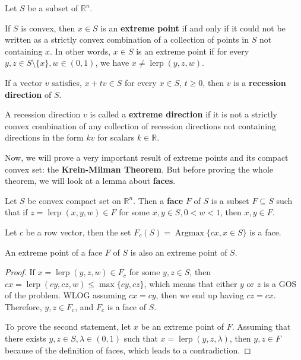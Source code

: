 \begin{definition}
  Let \( S \) be a subset of \( \mathbb{R}^{n} \).

  If \( S \) is convex, then \( x \in S \) is an \textbf{extreme point} if and only if
  it could not be written as a strictly convex combination of a collection
  of points in
  \( S \) not containing \( x \). In other words, \( x \in S \) is an extreme
  point if for every \( y, z \in S \setminus \{x\}, w \in (0, 1)   \), we have
  \( x \neq \operatorname{lerp}(y,z,w) \).

  If a vector \( v \) satisfies, \( x + tv \in S \) for every \( x \in S \), \(
  t \ge  0\), then \( v \) is a \textbf{recession direction} of \( S \).

  A recession direction \( v \) is called a \textbf{extreme direction} if it is
  not a strictly convex combination of any collection of recession directions
  not containing directions in the form \( kv \) for scalars \( k \in \mathbb{R}
  \).
\end{definition}

Now, we will prove a very important result of extreme points and its compact
convex set: the \textbf{Krein-Milman Theorem}. But before proving the whole
theorem, we will look at a lemma about \textbf{faces}.

\begin{lemma}
  Let \( S \) be convex compact set on \( \mathbb{R}^{n} \). Then a \textbf{face}
  \( F \)
  of \( S \) is a subset \( F \subseteq S \) such that if \( z =
  \operatorname{lerp}(x, y, w) \in F \) for some \( x, y \in S, 0 < w < 1 \),
  then \( x, y \in F\).

  Let \( c \) be a row vector, then the set \( F_{c}(S) = \operatorname{Argmax}
  \{cx, x \in S\}     \) is a face.

  An extreme point of a face \( F \) of \( S \) is also an extreme point of \( S
  \).
\end{lemma}

\begin{proof}
  If \( x = \operatorname{lerp}(y,z, w) \in F_{c} \) for some \( y,z \in S \),
  then \( cx = \operatorname{lerp}(cy, cz, w) \le \max \{cy, cz\}   \), which
  means that either \( y \) or \( z \) is a GOS of the problem. WLOG assuming \(
  cx = cy\), then we end up having \( cz = cx \). Therefore, \( y, z \in F_{c}
  \), and \( F_{c} \) is a face of \( S \).

  To prove the second statement, let \( x \) be an extreme point of \( F \).
  Assuming that there exists \( y, z \in S, \lambda \in (0, 1) \) such that \( x =
  \operatorname{lerp}(y, z, \lambda) \), then \( y, z \in F \) because of the
  definition of faces, which leads to a contradiction.
\end{proof}

